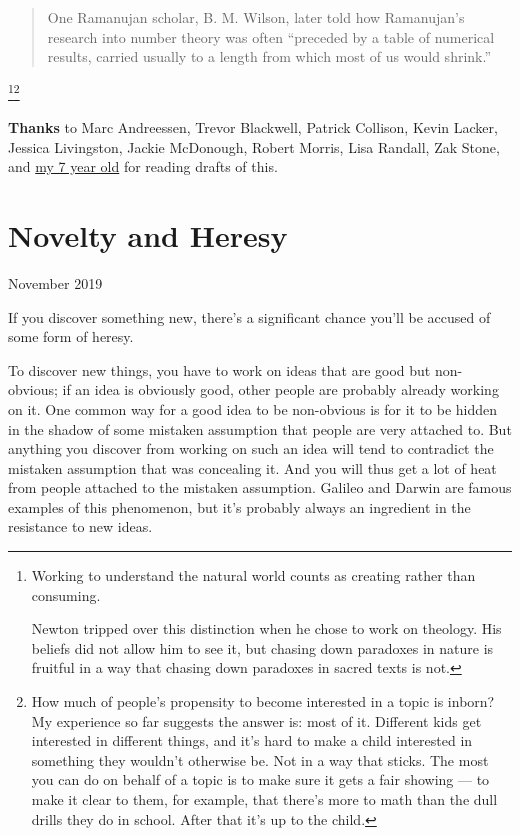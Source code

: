 \documentclass[12pt]{book}
\begin{document}
{\begin{quote}
One Ramanujan scholar, B. M. Wilson, later told how Ramanujan's research
into number theory was often ``preceded by a table of numerical results,
carried usually to a length from which most of us would shrink.''
\end{quote}}\footnote{Working to understand the natural world counts as creating
rather than consuming.

Newton tripped over this distinction when he chose to work on theology.
His beliefs did not allow him to see it, but chasing down paradoxes in
nature is fruitful in a way that chasing down paradoxes in sacred texts
is not.}\footnote{How much of people's propensity to become interested in a topic
is inborn? My experience so far suggests the answer is: most of it.
Different kids get interested in different things, and it's hard to make
a child interested in something they wouldn't otherwise be. Not in a way
that sticks. The most you can do on behalf of a topic is to make sure it
gets a fair showing --- to make it clear to them, for example, that
there's more to math than the dull drills they do in school. After that
it's up to the child.}

\textbf{Thanks} to Marc Andreessen, Trevor Blackwell, Patrick Collison,
Kevin Lacker, Jessica Livingston, Jackie McDonough, Robert Morris, Lisa
Randall, Zak Stone, and
\href{https://twitter.com/paulg/status/1196537802621669376}{my 7 year
old} for reading drafts of this.
\chapter{Novelty and Heresy}

November 2019

If you discover something new, there's a significant chance you'll be
accused of some form of heresy.

To discover new things, you have to work on ideas that are good but
non-obvious; if an idea is obviously good, other people are probably
already working on it. One common way for a good idea to be non-obvious
is for it to be hidden in the shadow of some mistaken assumption that
people are very attached to. But anything you discover from working on
such an idea will tend to contradict the mistaken assumption that was
concealing it. And you will thus get a lot of heat from people attached
to the mistaken assumption. Galileo and Darwin are famous examples of
this phenomenon, but it's probably always an ingredient in the
resistance to new ideas.
\end{document}
